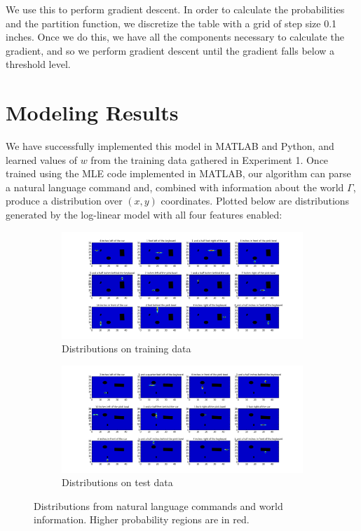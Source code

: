 \documentclass[12pt,letterpaper]{article}
\begin{document}
We use this to perform gradient descent. In order to calculate the probabilities and the partition function, we discretize the table with a grid of step size 0.1 inches. Once we do this, we have all the components necessary to calculate the gradient, and so we perform gradient descent until the gradient falls below a threshold level.

\section{Modeling Results}

We have successfully implemented this model in MATLAB and Python, and learned values of $w$ from the training data gathered in Experiment 1. Once trained using the MLE code implemented in MATLAB, our algorithm can parse a natural language command and, combined with information about the world $\Gamma$, produce a distribution over $(x, y)$ coordinates. Plotted below are distributions generated by the log-linear model with all four features enabled:

\begin{figure}
\centering
\begin{subfigure}{.5\textwidth}
  \centering
  \centerline{\includegraphics[scale=0.5]{images/all_commands_training.png}}
  \caption{ Distributions on training data}
  \label{fig:sub1}
\end{subfigure}
\begin{subfigure}{.5\textwidth}
  \centering
  \centerline{\includegraphics[scale=0.5]{images/all_commands_test.png}}
  \caption{Distributions on test data}
  \label{fig:sub2}
\end{subfigure}
\caption{Distributions from natural language commands and world information. Higher probability regions are in red.}
\label{fig:plot_distributions}
\end{figure}
\end{document}
